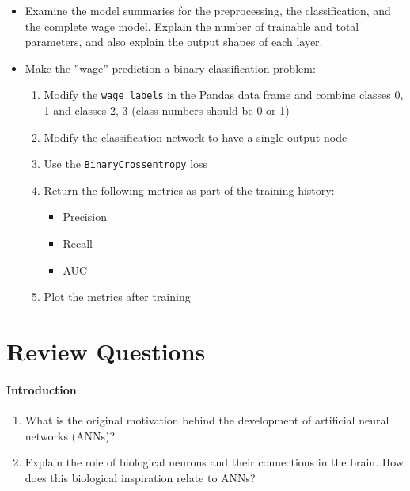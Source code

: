 \begin{withcode}
\begin{exerciseboxcomputer}

\begin{itemize}
   \item Examine the model summaries for the preprocessing, the classification, and the complete wage model. Explain the number of trainable and total parameters, and also explain the output shapes of each layer.
   \item Make the ''wage'' prediction a binary classification problem:
   \begin{enumerate}
      \item Modify the \texttt{wage\_labels} in the Pandas data frame and combine classes 0, 1 and classes 2, 3 (class numbers should be 0 or 1)
      \item Modify the classification network to have a single output node
      \item Use the \texttt{BinaryCrossentropy} loss
      \item Return the following metrics as part of the training history:
      \begin{itemize}
          \item Precision
          \item Recall
          \item AUC
      \end{itemize}
      \item Plot the metrics after training
   \end{enumerate}
\end{itemize}
\end{exerciseboxcomputer}

\end{withcode}

\FloatBarrier

\section{Review Questions}

\paragraph*{Introduction}
\begin{enumerate}[nosep]
    \item What is the original motivation behind the development of artificial neural networks (ANNs)?
    \item Explain the role of biological neurons and their connections in the brain. How does this biological inspiration relate to ANNs?
\end{enumerate}

